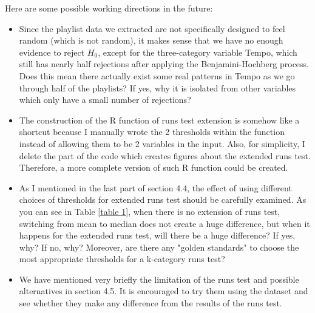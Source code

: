 \documentclass[12pt]{article}
\theoremstyle{plain}
\theoremstyle{definition}
\theoremstyle{remark}
\begin{document}
Here are some possible working directions in the future:
\begin{itemize}
    \item Since the playlist data we extracted are not specifically designed to feel random (which is not random), it makes sense that we have no enough evidence to reject $H_0$, except for the three-category variable Tempo, which still has nearly half rejections after applying the Benjamini-Hochberg process. Does this mean there actually exist some real patterns in Tempo as we go through half of the playlists? If yes, why it is isolated from other variables which only have a small number of rejections?
    \item The construction of the R function of runs test extension is somehow like a shortcut because I manually wrote the 2 thresholds within the function instead of allowing them to be 2 variables in the input. Also, for simplicity, I delete the part of the code which creates figures about the extended runs test. Therefore, a more complete version of such R function could be created.
    \item As I mentioned in the last part of section 4.4, the effect of using different choices of thresholds for extended runs test should be carefully examined. As you can see in Table \ref{table 1}, when there is no extension of runs test, switching from mean to median does not create a huge difference, but when it happens for the extended runs test, will there be a huge difference? If yes, why? If no, why? Moreover, are there any "golden standards" to choose the most appropriate thresholds for a k-category runs test? 
    \item We have mentioned very briefly the limitation of the runs test and possible alternatives in section 4.5. It is encouraged to try them using the dataset and see whether they make any difference from the results of the runs test.
\end{itemize}
\end{document}
